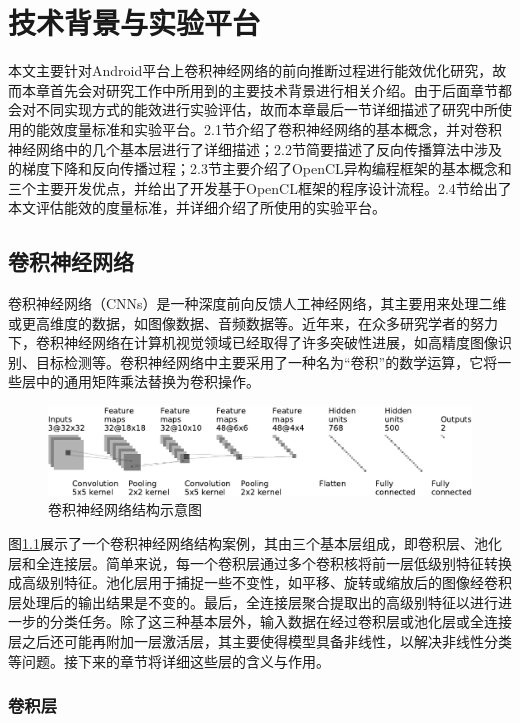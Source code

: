 \chapter{技术背景与实验平台}
本文主要针对Android平台上卷积神经网络的前向推断过程进行能效优化研究，故而本章首先会对研究工作中所用到的主要技术背景进行相关介绍。由于后面章节都会对不同实现方式的能效进行实验评估，故而本章最后一节详细描述了研究中所使用的能效度量标准和实验平台。2.1节介绍了卷积神经网络的基本概念，并对卷积神经网络中的几个基本层进行了详细描述；2.2节简要描述了反向传播算法中涉及的梯度下降\cite{bottou2010large}和反向传播过程；2.3节主要介绍了OpenCL异构编程框架的基本概念和三个主要开发优点，并给出了开发基于OpenCL框架的程序设计流程。2.4节给出了本文评估能效的度量标准，并详细介绍了所使用的实验平台。

\section{卷积神经网络}
卷积神经网络（CNNs）是一种深度前向反馈人工神经网络\cite{schalkoff1997artificial}，其主要用来处理二维或更高维度的数据，如图像数据、音频数据等。近年来，在众多研究学者的努力下，卷积神经网络在计算机视觉领域已经取得了许多突破性进展，如高精度图像识别、目标检测等。卷积神经网络中主要采用了一种名为“卷积”的数学运算，它将一些层中的通用矩阵乘法替换为卷积操作。

\begin{figure}[htbp]
    \includegraphics[width=1\textwidth]{figures/convnet_fig_cropped.pdf}
    \caption{卷积神经网络结构示意图 \cite{github.com}}\label{figure:figure1}
\end{figure}

图\ref{figure:figure1}展示了一个卷积神经网络结构案例，其由三个基本层组成，即卷积层、池化层和全连接层。简单来说，每一个卷积层通过多个卷积核将前一层低级别特征转换成高级别特征。池化层用于捕捉一些不变性，如平移、旋转或缩放后的图像经卷积层处理后的输出结果是不变的。最后，全连接层聚合提取出的高级别特征以进行进一步的分类任务。除了这三种基本层外，输入数据在经过卷积层或池化层或全连接层之后还可能再附加一层激活层，其主要使得模型具备非线性，以解决非线性分类等问题。接下来的章节将详细这些层的含义与作用。

\subsection{卷积层}
